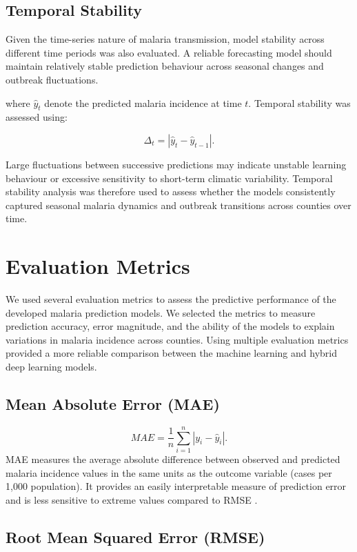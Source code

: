 	\subsection{Temporal Stability}
	
	Given the time-series nature of malaria transmission, model stability across different time periods was also evaluated. A reliable forecasting model should maintain relatively stable prediction behaviour across seasonal changes and outbreak fluctuations.
	
	where \(\hat{y}_{t}\) denote the predicted malaria incidence at time \(t\). Temporal stability was assessed using:
	
	\[
	\Delta_t = |\hat{y}_{t} - \hat{y}_{t-1}|.
	\]
	
	Large fluctuations between successive predictions may indicate unstable learning behaviour or excessive sensitivity to short-term climatic variability. Temporal stability analysis was therefore used to assess whether the models consistently captured seasonal malaria dynamics and outbreak transitions across counties over time.
	

	\section{Evaluation Metrics}
	\label{sec:evaluation_metrics}
	
	 We used several evaluation metrics to assess the predictive performance of the developed malaria prediction models. We selected the metrics to measure prediction accuracy, error magnitude, and the ability of the models to explain variations in malaria incidence across counties. Using multiple evaluation metrics provided a more reliable comparison between the machine learning and hybrid deep learning models.

	\subsection{Mean Absolute Error (MAE)}
	
	\[
	MAE = \frac{1}{n} \sum_{i=1}^{n} |y_i - \hat{y}_i|.
	\]
   MAE measures the average absolute difference between observed and predicted malaria incidence values in the same units as the outcome variable (cases per 1,000 population). It provides an easily interpretable measure of prediction error and is less sensitive to extreme values compared to RMSE \cite{Ly2025Forecasting}.
	
	\subsection{Root Mean Squared Error (RMSE)}
	
